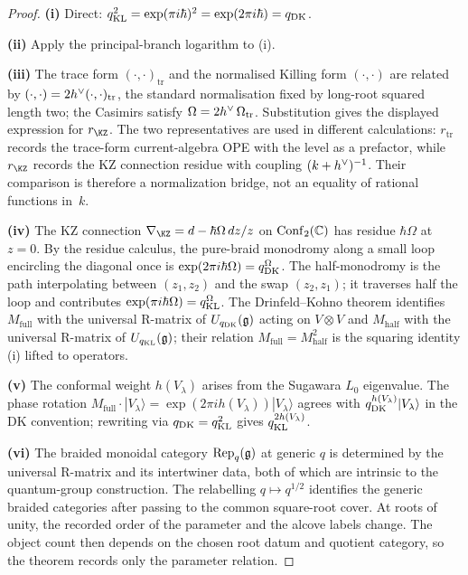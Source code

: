 \begin{proof}
\textbf{(i)} Direct: $q_{\mathrm{KL}}^{2} = \exp(\pi i \hbar)^{2} =
\exp(2 \pi i \hbar) = q_{\mathrm{DK}}$.

\textbf{(ii)} Apply the principal-branch logarithm to (i).

\textbf{(iii)} The trace form $(\cdot, \cdot)_{\mathrm{tr}}$ and
the normalised Killing form $(\cdot, \cdot)$ are related by
$(\cdot, \cdot) = 2h^{\vee} (\cdot, \cdot)_{\mathrm{tr}}$, the
standard normalisation fixed by long-root squared length two; the
Casimirs satisfy $\Omega = 2 h^{\vee} \, \Omega_{\mathrm{tr}}$.
Substitution gives the displayed expression for $r_{\KZ}$. The two
representatives are used in different calculations:
$r_{\mathrm{tr}}$ records the trace-form current-algebra OPE with
the level as a prefactor, while $r_{\KZ}$ records the KZ connection
residue with coupling $(k+h^{\vee})^{-1}$. Their comparison is therefore
a normalization bridge, not an equality of rational functions in~$k$.

\textbf{(iv)} The KZ connection $\nabla_{\KZ} = d - \hbar
\Omega \, dz/z$ on $\mathrm{Conf}_{2}(\mathbb{C})$ has residue $\hbar \Omega$
at $z = 0$. By the residue calculus, the pure-braid monodromy
along a small loop encircling the diagonal once is $\exp(2\pi i
\hbar \Omega) = q_{\mathrm{DK}}^{\Omega}$. The half-monodromy is the
path interpolating between $(z_{1}, z_{2})$ and the swap
$(z_{2}, z_{1})$; it traverses half the loop and contributes
$\exp(\pi i \hbar \Omega) = q_{\mathrm{KL}}^{\Omega}$. The
Drinfeld--Kohno theorem identifies $M_{\mathrm{full}}$ with the
universal R-matrix of $U_{q_{\mathrm{DK}}}(\mathfrak{g})$ acting on $V \otimes V$
and $M_{\mathrm{half}}$ with the universal R-matrix of
$U_{q_{\mathrm{KL}}}(\mathfrak{g})$; their relation $M_{\mathrm{full}} =
M_{\mathrm{half}}^{2}$ is the squaring identity \textup{(i)}
lifted to operators.

\textbf{(v)} The conformal weight $h(V_{\lambda})$ arises from the
Sugawara $L_{0}$ eigenvalue. The phase rotation
$M_{\mathrm{full}} \cdot |V_{\lambda}\rangle = \exp(2\pi i
h(V_{\lambda})) |V_{\lambda}\rangle$ agrees with
$q_{\mathrm{DK}}^{h(V_{\lambda})} |V_{\lambda}\rangle$ in the DK
convention; rewriting via $q_{\mathrm{DK}} = q_{\mathrm{KL}}^{2}$ gives
$q_{\mathrm{KL}}^{2 h(V_{\lambda})}$.

\textbf{(vi)} The braided monoidal category $\mathrm{Rep}_{q}(\mathfrak{g})$ at
generic $q$ is determined by the universal R-matrix and its
intertwiner data, both of which are intrinsic to the
quantum-group construction. The relabelling $q \mapsto q^{1/2}$
identifies the generic braided categories after passing to the
common square-root cover. At roots of unity, the recorded order of
the parameter and the alcove labels change. The object count then
depends on the chosen root datum and quotient category, so the
theorem records only the parameter relation.
\end{proof}

